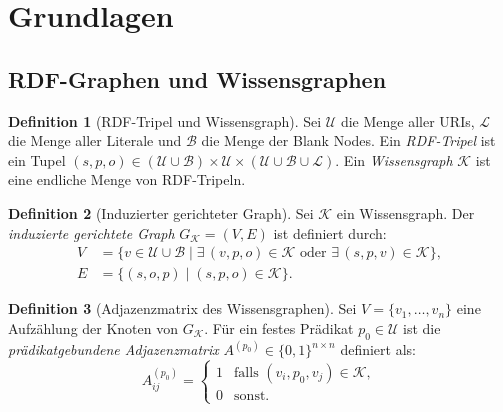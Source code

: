 ﻿\documentclass[a4paper,12pt]{article}
\theoremstyle{definition}
\newtheorem{definition}{Definition}
\begin{document}
\section{Grundlagen}
\label{sec:grundlagen}

\subsection{RDF-Graphen und Wissensgraphen}

\begin{definition}[RDF-Tripel und Wissensgraph]
Sei $\mathcal{U}$ die Menge aller URIs, $\mathcal{L}$ die Menge aller Literale und
$\mathcal{B}$ die Menge der Blank Nodes. Ein \emph{RDF-Tripel} ist ein Tupel
$(s, p, o) \in (\mathcal{U} \cup \mathcal{B}) \times \mathcal{U}
\times (\mathcal{U} \cup \mathcal{B} \cup \mathcal{L})$.
Ein \emph{Wissensgraph} $\mathcal{K}$ ist eine endliche Menge von RDF-Tripeln.
\end{definition}

\begin{definition}[Induzierter gerichteter Graph]
Sei $\mathcal{K}$ ein Wissensgraph. Der \emph{induzierte gerichtete Graph}
$G_{\mathcal{K}} = (V, E)$ ist definiert durch:
\begin{align*}
  V &= \{v \in \mathcal{U} \cup \mathcal{B} \mid \exists\, (v,p,o) \in \mathcal{K}
       \text{ oder } \exists\, (s,p,v) \in \mathcal{K}\}, \\
  E &= \{(s, o, p) \mid (s, p, o) \in \mathcal{K}\}.
\end{align*}
\end{definition}

\begin{definition}[Adjazenzmatrix des Wissensgraphen]
Sei $V = \{v_1, \ldots, v_n\}$ eine Aufzählung der Knoten von $G_{\mathcal{K}}$.
Für ein festes Prädikat $p_0 \in \mathcal{U}$ ist die \emph{prädikatgebundene
Adjazenzmatrix} $A^{(p_0)} \in \{0,1\}^{n \times n}$ definiert als:
\[
  A^{(p_0)}_{ij} = \begin{cases}
    1 & \text{falls } (v_i, p_0, v_j) \in \mathcal{K}, \\
    0 & \text{sonst}.
  \end{cases}
\]
\end{definition}
\end{document}
